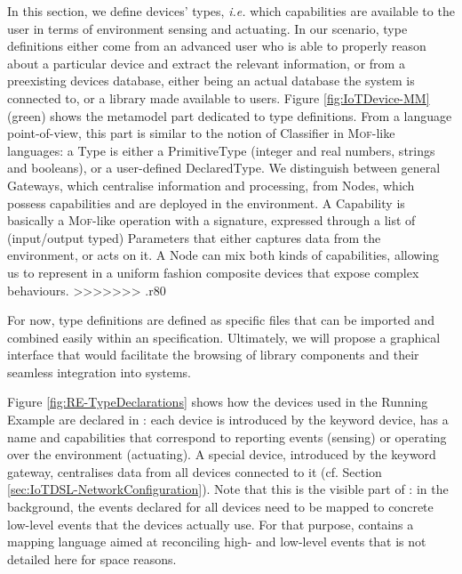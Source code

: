 In this section, we define \IOT devices' types, \textit{i.e.} which capabilities are available to the user in terms of environment sensing and actuating. In our scenario, type definitions either come from an advanced user who is able to properly reason about a particular device and extract the relevant information, or from a preexisting devices database, either being an actual database the system is connected to, or a library made available to users. Figure \ref{fig:IoTDevice-MM} (green) shows the metamodel part dedicated to type definitions. From a language point-of-view, this part is similar to the notion of \textsf{Classifier} in \textsc{Mof}-like languages: a \textsf{Type} is either a \textsf{PrimitiveType} (integer and real numbers, strings and booleans), or a user-defined \textsf{DeclaredType}. We distinguish between general \textsf{Gateway}s, which centralise information and processing, from \textsf{Node}s, which possess capabilities and are deployed in the environment. A \textsf{Capability} is basically a \textsc{Mof}-like operation with a signature, expressed through a list of (input/output typed) \textsf{Parameter}s that either captures data from the environment, or acts on it. A \textsf{Node} can mix both kinds of capabilities, allowing us to represent in a uniform fashion composite devices that expose complex behaviours.
>>>>>>> .r80
	
For now, type definitions are defined as specific files that can be imported and combined easily within an \IOT specification. Ultimately, we will propose a graphical interface that would facilitate the browsing of library components and their seamless integration into \IOT systems.

Figure \ref{fig:RE-TypeDeclarations} shows how the devices used in the Running Example are declared in \IOTDSL: each device is introduced by the keyword \textsf{device}, has a name and capabilities that correspond to reporting events (\textsf{sensing}) or operating over the environment (\textsf{actuating}). A special device, introduced by the keyword \textsf{gateway}, centralises data from all devices connected to it (cf. Section \ref{sec:IoTDSL-NetworkConfiguration}). Note that this is the visible part of \IOTDSL: in the background, the events declared for all devices need to be mapped to concrete low-level events that the devices actually use. For that purpose, \IOTDSL contains a mapping language aimed at reconciling high- and low-level events that is not detailed here for space reasons.

